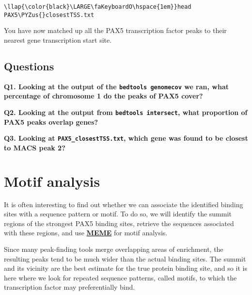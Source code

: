 \documentclass[11pt]{article}
\def\PYZus{\char`\_}
\begin{document}
\begin{terminalinput}
\begin{Verbatim}[commandchars=\\\{\}]
\llap{\color{black}\LARGE\faKeyboardO\hspace{1em}}head PAX5\PYZus{}closestTSS.txt
\end{Verbatim}
\end{terminalinput}



    You have now matched up all the PAX5 transcription factor peaks to their
nearest gene transcription start site.

    \hypertarget{questions}{%
\subsection{Questions}\label{questions}}

\textbf{Q1. Looking at the output of the \texttt{bedtools\ genomecov} we
ran, what percentage of chromosome 1 do the peaks of PAX5 cover?}

\textbf{Q2. Looking at the output from \texttt{bedtools\ intersect},
what proportion of PAX5 peaks overlap genes?}

\textbf{Q3. Looking at \texttt{PAX5\_closestTSS.txt}, which gene was
found to be closest to MACS peak 2?}




\newpage





    \hypertarget{motif-analysis}{%
\section{Motif analysis}\label{motif-analysis}}

    It is often interesting to find out whether we can associate the
identified binding sites with a sequence pattern or motif. To do so, we
will identify the summit regions of the strongest PAX5 binding sites,
retrieve the sequences associated with these regions, and use
\textbf{\href{http://meme-suite.org/tools/meme}{MEME}} for motif
analysis.

Since many peak-finding tools merge overlapping areas of enrichment, the
resulting peaks tend to be much wider than the actual binding sites. The
summit and its vicinity are the best estimate for the true protein
binding site, and so it is here where we look for repeated sequence
patterns, called motifs, to which the transcription factor may
preferentially bind.
\end{document}
